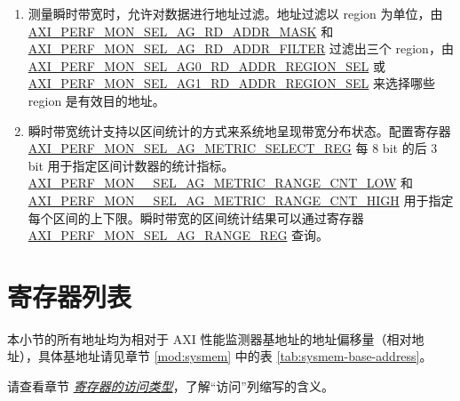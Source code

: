 \documentclass[main\_\_CN.tex]{subfiles}
\begin{document}
\begin{enumerate}
    \item 测量瞬时带宽时，允许对数据进行地址过滤。地址过滤以 region 为单位，由 \hyperref[fielddesc:AXIPERFMONSELAGNRDADDRMASKM]{AXI\_PERF\_MON\_SEL\_AG\_RD\_ADDR\_MASK} 和 \hyperref[fielddesc:AXIPERFMONSELAGNRDADDRFILTERM]{AXI\_PERF\_MON\_SEL\_AG\_RD\_ADDR\_FILTER} 过滤出三个 region，由 \hyperref[fielddesc:AXIPERFMONSELAG0RDADDRREGIONSEL]{AXI\_PERF\_MON\_SEL\_AG0\_RD\_ADDR\_REGION\_SEL} 或 \hyperref[fielddesc:AXIPERFMONSELAG1RDADDRREGIONSEL]{AXI\_PERF\_MON\_SEL\_AG1\_RD\_ADDR\_REGION\_SEL} 来选择哪些 region 是有效目的地址。
    \item 瞬时带宽统计支持以区间统计的方式来系统地呈现带宽分布状态。配置寄存器 \hyperref[regdesc:AXIPERFMONSELAGNMETRICSELECTMREG]{AXI\_PERF\_MON\_SEL\_AG\_METRIC\_SELECT\_REG} 每 8 bit 的后 3 bit 用于指定区间计数器的统计指标。\hyperref[fielddesc:AXIPERFMONSELAGNMETRICRANGEMCNTLOW]{AXI\_PERF\_MON\_\_SEL\_AG\_METRIC\_RANGE\_CNT\_LOW} 和 \hyperref[fielddesc:AXIPERFMONSELAGNMETRICRANGEMCNTHIGH]{AXI\_PERF\_MON\_\_SEL\_AG\_METRIC\_RANGE\_CNT\_HIGH} 
    用于指定每个区间的上下限。瞬时带宽的区间统计结果可以通过寄存器 \hyperref[regdesc:AXIPERFMONSELAGNRANGEMREG]{AXI\_PERF\_MON\_SEL\_AG\_RANGE\_REG} 查询。
\end{enumerate}





\newpage
\hypertarget{aximon-reg-summ}{}
\section{寄存器列表}
\label{sec:aximon-reg-summ}


本小节的所有地址均为相对于 AXI 性能监测器基地址的地址偏移量（相对地址），具体基地址请见章节 \ref{mod:sysmem} \textit{} 中的表 \ref{tab:sysmem-base-address}。

请查看章节 \hyperref[glossary-access-types]{\textit{寄存器的访问类型}}，了解“访问”列缩写的含义。




\end{document}
